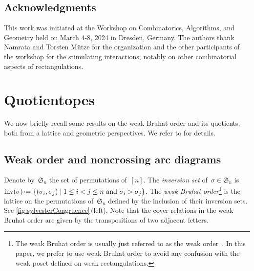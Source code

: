 \documentclass{amsart}
\theoremstyle{definition}
\newcommand{\f}[1]{\mathfrak{#1}} %
\newcommand{\set}[2]{\left\{ #1 \;\middle|\; #2 \right\}} %
\newcommand{\eqdef}{\mbox{\,\raisebox{0.2ex}{\scriptsize\ensuremath{\mathrm:}}\ensuremath{=}\,}} %
\DeclareMathOperator{\inv}{inv} %
\newcommand{\darkblue}{\color{darkblue}} %
\newcommand{\defn}[1]{\textsl{\darkblue #1}} %
\begin{document}

\subsection*{Acknowledgments}

This work was initiated at the Workshop on Combinatorics, Algorithms, and Geometry held on March 4-8, 2024 in Dresden, Germany.
The authors thank Namrata and Torsten M\"utze for the organization and the other participants of the workshop for the stimulating interactions, notably on other combinatorial aspects of rectangulations.


\section{Quotientopes}
\label{sec:quotientopes}

We now briefly recall some results on the weak Bruhat order and its quotients, both from a lattice and geometric perspectives.
We refer to \cite{MR2142177, Reading-arcDiagrams, MR3645055, MR3645056, MR3964495, MR4584712} for details.


\subsection{Weak order and noncrossing arc diagrams}
\label{subsec:noncrossingArcDiagrams}

Denote by~$\f{S}_n$ the set of permutations of~$[n]$.
The \defn{inversion set} of~$\sigma \in \f{S}_n$ is~$\inv(\sigma) \eqdef \set{(\sigma_i, \sigma_j)}{1 \le i < j \le n \text{ and } \sigma_i > \sigma_j}$.
The \defn{weak Bruhat order}\footnote{The weak Bruhat order is usually just referred to as the weak order~\cite{MR1066460, MR2133266}. In this paper, we prefer to use weak Bruhat order to avoid any confusion with the weak poset defined on weak rectangulations.} is the lattice on the permutations of~$\f{S}_n$ defined by the inclusion of their inversion sets.
See \cref{fig:sylvesterCongruence}\,(left).
Note that the cover relations in the weak Bruhat order are given by the transpositions of two adjacent letters.
\end{document}

